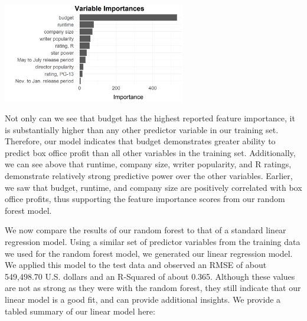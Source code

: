 \documentclass[10pt]{article}
\begin{document}
\begin{center}
\includegraphics[width=8cm]{_assets/predictive_analysis/variable_importance_rf_bop.png}
\end{center}

Not only can we see that budget has the highest reported feature importance, it is substantially higher than any other predictor variable in our training set. Therefore, our model indicates that budget demonstrates greater ability to predict box office profit than all other variables in the training set. Additionally, we can see above that runtime, company size, writer popularity, and R ratings, demonstrate relatively strong predictive power over the other variables. Earlier, we saw that budget, runtime, and company size are positively correlated with box office profits, thus supporting the feature importance scores from our random forest model.

We now compare the results of our random forest to that of a standard linear regression model. Using a similar set of predictor variables from the training data we used for the random forest model, we generated our linear regression model. We applied this model to the test data and observed an RMSE of about 549,498.70 U.S. dollars and an R-Squared of about 0.365. Although these values are not as strong as they were with the random forest, they still indicate that our linear model is a good fit, and can provide additional insights. We provide a tabled summary of our linear model here:


\end{document}
